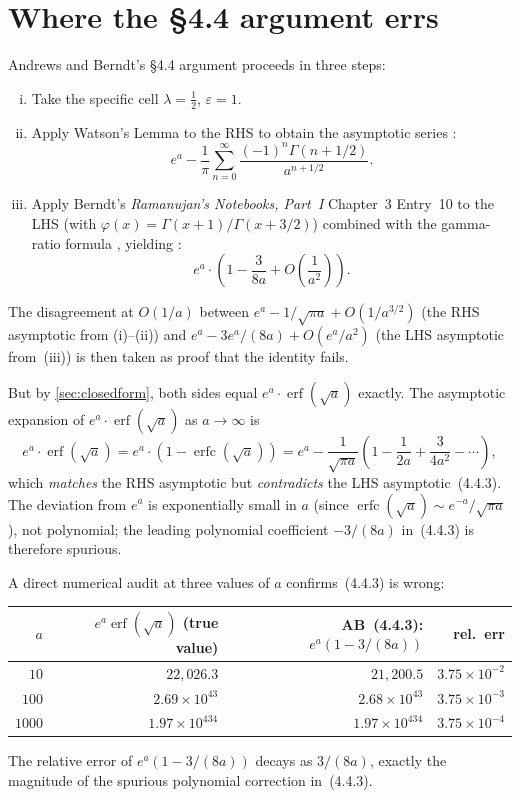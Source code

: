 \documentclass[11pt,reqno]{amsart}
\theoremstyle{definition}
\DeclareMathOperator{\erf}{erf}
\DeclareMathOperator{\erfc}{erfc}
\begin{document}
\section{Where the \S4.4 argument errs}\label{sec:where-errs}

Andrews and Berndt's \S4.4 argument proceeds in three steps:
\begin{enumerate}[(i)]
\item Take the specific cell $\lambda = \tfrac12$, $\varepsilon = 1$.
\item Apply Watson's Lemma to the RHS to obtain the asymptotic series
\cite[p.~117, eq.~(4.4.1)]{AB2013}:
\[
e^a - \frac{1}{\pi} \sum_{n=0}^\infty \frac{(-1)^n \Gamma(n + 1/2)}{a^{n + 1/2}}.
\]
\item Apply Berndt's \emph{Ramanujan's Notebooks, Part~I} Chapter~3
Entry~10 \cite{BerndtNB1} to the LHS (with
$\varphi(x) = \Gamma(x + 1)/\Gamma(x + 3/2)$) combined with the
gamma-ratio formula \cite[p.~116, eq.~(4.4.2)]{AB2013}, yielding
\cite[p.~117, eq.~(4.4.3)]{AB2013}:
\[
e^a \cdot \left(1 - \frac{3}{8a} + O\!\left(\frac{1}{a^2}\right)\right).
\]
\end{enumerate}
The disagreement at $O(1/a)$ between
$e^a - 1/\sqrt{\pi a} + O(1/a^{3/2})$ (the RHS asymptotic from
(i)--(ii)) and $e^a - 3 e^a/(8a) + O(e^a/a^2)$ (the LHS asymptotic
from~(iii)) is then taken as proof that the identity fails.

But by \cref{sec:closedform}, both sides equal
$e^a \cdot \erf(\sqrt{a})$ exactly. The asymptotic expansion of
$e^a \cdot \erf(\sqrt{a})$ as $a \to \infty$ is
\begin{equation}
e^a \cdot \erf(\sqrt{a}) = e^a \cdot (1 - \erfc(\sqrt{a}))
= e^a - \frac{1}{\sqrt{\pi a}}\left(1 - \frac{1}{2a} + \frac{3}{4a^2} - \cdots\right),
\end{equation}
which \emph{matches} the RHS asymptotic but \emph{contradicts} the
LHS asymptotic~(4.4.3). The deviation from $e^a$ is exponentially
small in $a$ (since $\erfc(\sqrt{a}) \sim e^{-a}/\sqrt{\pi a}$), not
polynomial; the leading polynomial coefficient $-3/(8a)$ in~(4.4.3)
is therefore spurious.

A direct numerical audit at three values of $a$ confirms~(4.4.3) is
wrong:
\begin{center}
\begin{tabular}{r|r|r|r}
$a$ & $e^a \erf(\sqrt{a})$ (true value) & AB~(4.4.3): $e^a(1 - 3/(8a))$ & rel.~err \\
\hline
$10$ & $22{,}026.3$ & $21{,}200.5$ & $3.75 \times 10^{-2}$ \\
$100$ & $2.69 \times 10^{43}$ & $2.68 \times 10^{43}$ & $3.75 \times 10^{-3}$ \\
$1000$ & $1.97 \times 10^{434}$ & $1.97 \times 10^{434}$ & $3.75 \times 10^{-4}$ \\
\end{tabular}
\end{center}
The relative error of $e^a(1 - 3/(8a))$ decays as $3/(8a)$, exactly
the magnitude of the spurious polynomial correction in~(4.4.3).
\end{document}
